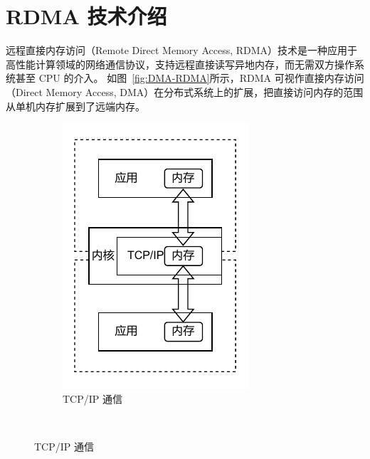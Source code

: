 {    \section{RDMA 技术介绍}
    远程直接内存访问（Remote Direct Memory Access, RDMA）技术是一种应用于高性能计算领域的网络通信协议，支持远程直接读写异地内存，而无需双方操作系统甚至 CPU 的介入。
    如图~\ref{fig:DMA-RDMA}所示，RDMA 可视作直接内存访问（Direct Memory Access, DMA）在分布式系统上的扩展，把直接访问内存的范围从单机内存扩展到了远端内存。
    \begin{figure}[!htbp]
        \centering
        \begin{subfigure}[b]{0.30\textwidth}
            \includegraphics[width=\textwidth]{Img/TCP_IP通信.drawio.pdf}
            \caption{TCP/IP 通信}
            \label{fig:TCPIP}
        \end{subfigure}%
        ~~~~~%

\end{figure}}
